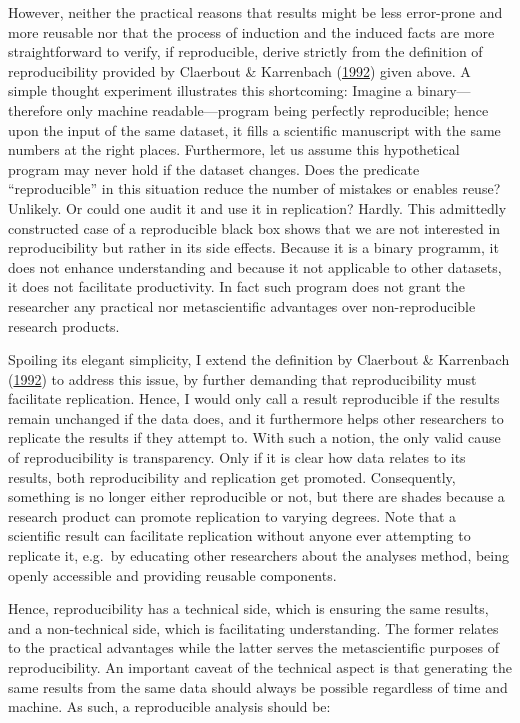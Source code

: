 \documentclass[12pt,a4paper,twoside]{article}
\begin{document}
However, neither the practical reasons that results might be less error-prone and more reusable nor that the process of induction and the induced facts are more straightforward to verify, if reproducible, derive strictly from the definition of reproducibility provided by Claerbout \& Karrenbach (\protect\hyperlink{ref-claerboutElectronicDocumentsGive1992}{1992}) given above.
A simple thought experiment illustrates this shortcoming:
Imagine a binary---therefore only machine readable---program being perfectly reproducible; hence upon the input of the same dataset, it fills a scientific manuscript with the same numbers at the right places.
Furthermore, let us assume this hypothetical program may never hold if the dataset changes.
Does the predicate ``reproducible'' in this situation reduce the number of mistakes or enables reuse? Unlikely.
Or could one audit it and use it in replication? Hardly.
This admittedly constructed case of a reproducible black box shows that we are not interested in reproducibility but rather in its side effects.
Because it is a binary programm, it does not enhance understanding and because it not applicable to other datasets, it does not facilitate productivity.
In fact such program does not grant the researcher any practical nor metascientific advantages over non-reproducible research products.

Spoiling its elegant simplicity, I extend the definition by Claerbout \& Karrenbach (\protect\hyperlink{ref-claerboutElectronicDocumentsGive1992}{1992}) to address this issue, by further demanding that reproducibility must facilitate replication.
Hence, I would only call a result reproducible if the results remain unchanged if the data does, and it furthermore helps other researchers to replicate the results if they attempt to.
With such a notion, the only valid cause of reproducibility is transparency.
Only if it is clear how data relates to its results, both reproducibility and replication get promoted.
Consequently, something is no longer either reproducible or not, but there are shades because a research product can promote replication to varying degrees.
Note that a scientific result can facilitate replication without anyone ever attempting to replicate it, e.g.~by educating other researchers about the analyses method, being openly accessible and providing reusable components.

Hence, reproducibility has a technical side, which is ensuring the same results, and a non-technical side, which is facilitating understanding.
The former relates to the practical advantages while the latter serves the metascientific purposes of reproducibility.
An important caveat of the technical aspect is that generating the same results from the same data should always be possible regardless of time and machine.
As such, a reproducible analysis should be:
\end{document}
